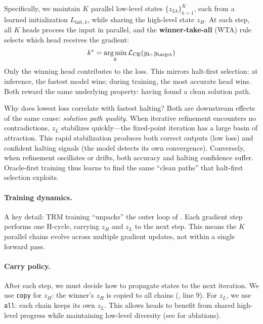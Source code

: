 Specifically, we maintain $K$ parallel low-level states
$\{z_{Lk}\}_{k=1}^K$, each from a learned initialization
$L_{\text{init},k}$, while sharing the high-level state $z_H$. At each
step, all $K$ heads process the input in parallel, and the
\textbf{winner-take-all} (WTA) rule selects which head receives the gradient:
%
\begin{equation}
  k^* = \argmin_k \mathcal{L}_{\text{CE}}(y_k, y_\text{target})
\end{equation}
%
Only the winning head contributes to the loss. This mirrors halt-first
selection: at inference, the fastest model wins; during training, the most
accurate head wins. Both reward the same underlying property: having found a
clean solution path.

Why does lowest loss correlate with fastest halting? Both are downstream effects
of the same cause: \emph{solution path quality}. When iterative refinement
encounters no contradictions, $z_L$ stabilizes quickly---the fixed-point
iteration has a large basin of attraction. This rapid stabilization produces
both correct outputs (low loss) and confident halting signals (the model
detects its own convergence). Conversely, when refinement oscillates or drifts,
both accuracy and halting confidence suffer. Oracle-first training thus learns
to find the same ``clean paths'' that halt-first selection exploits.

\paragraph{Training dynamics.} A key detail: TRM training ``unpacks'' the outer
loop of . Each gradient step performs one H-cycle, carrying
$z_H$ and $z_L$ to the next step. This means the $K$ parallel chains evolve
across multiple gradient updates, not within a single forward pass.

\paragraph{Carry policy.} After each step, we must decide how to propagate
states to the next iteration. We use \texttt{copy} for $z_H$: the
winner's $z_H$ is copied to all chains (, line 9). For $z_L$, we
use \texttt{all}: each chain keeps its own $z_L$. This allows heads to benefit
from shared high-level progress while maintaining low-level diversity (see
 for ablations).

